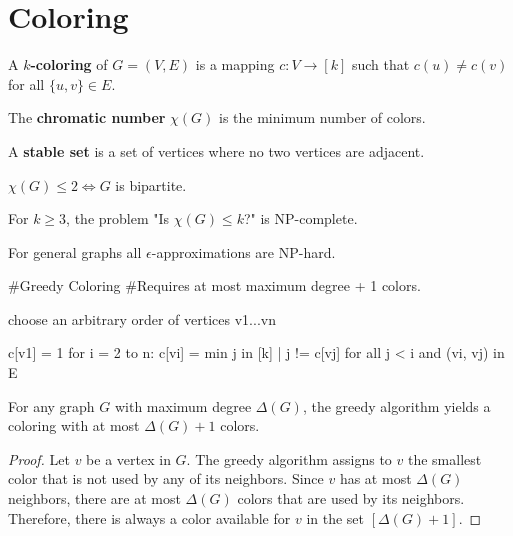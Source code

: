 \section{Coloring}

\begin{definition}
	A \textbf{$k$-coloring} of $G = (V, E)$ is a mapping $c: V \to [k]$ such that $c(u) \neq c(v)$ for all $\{u,v\} \in E$.
\end{definition}

\begin{definition}
	The \textbf{chromatic number} $\chi(G)$ is the minimum number of colors.
\end{definition}

\begin{definition}
	A \textbf{stable set} is a set of vertices where no two vertices are adjacent.
\end{definition}

\begin{theorem}
	$\chi(G) \le 2 \iff G$ is bipartite.
\end{theorem}

\begin{theorem}
	For $k \ge 3$, the problem "Is $\chi(G) \le k$?" is NP-complete.
\end{theorem}

\begin{remark}
	For general graphs all $\epsilon$-approximations are NP-hard.
\end{remark}

\begin{algorithm}
	#Greedy Coloring
	#Requires at most maximum degree + 1 colors.

	choose an arbitrary order of vertices v1...vn

	c[v1] = 1
	for i = 2 to n:
	c[vi] = min { j in [k] | j != c[vj] for all j < i and (vi, vj) in E }
\end{algorithm}

\begin{lemma}
	For any graph $G$ with maximum degree $\Delta(G)$, the greedy algorithm yields a coloring with at most $\Delta(G) + 1$ colors.
\end{lemma}

\begin{proof}
	Let $v$ be a vertex in $G$. The greedy algorithm assigns to $v$ the smallest color that is not used by any of its neighbors. Since $v$ has at most $\Delta(G)$ neighbors, there are at most $\Delta(G)$ colors that are used by its neighbors. Therefore, there is always a color available for $v$ in the set $[\Delta(G) + 1]$.
\end{proof}

